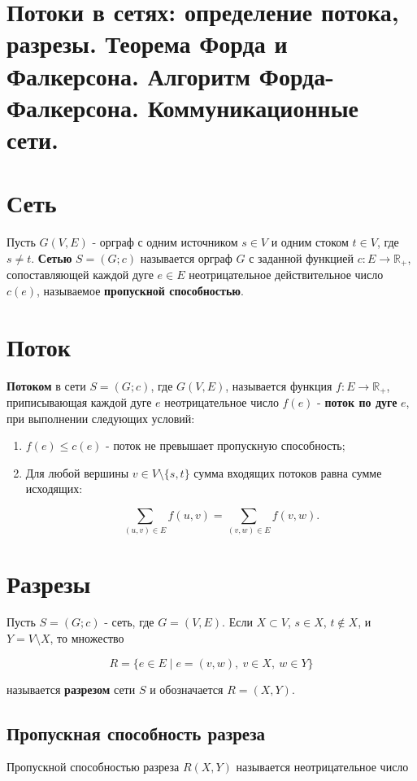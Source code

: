 {
	\section{Потоки в сетях: определение потока, разрезы. Теорема Форда и Фалкерсона.
Алгоритм Форда-Фалкерсона. Коммуникационные сети.}

\section*{Сеть}

Пусть $G(V, E)$ - орграф с одним источником $s \in V$ и одним стоком $t \in V$, где $s \ne t$.  
\textbf{Сетью} $S = (G; c)$ называется орграф $G$ с заданной функцией $c : E \rightarrow \mathbb{R}_+$, сопоставляющей каждой дуге $e \in E$ неотрицательное действительное число $c(e)$, называемое \textbf{пропускной способностью}.

\section*{Поток}

\textbf{Потоком} в сети $S = (G; c)$, где $G(V, E)$, называется функция $f : E \rightarrow \mathbb{R}_+$, приписывающая каждой дуге $e$ неотрицательное число $f(e)$ - \textbf{поток по дуге} $e$, при выполнении следующих условий:
\begin{enumerate}
  \item $f(e) \leq c(e)$ - поток не превышает пропускную способность;
  \item Для любой вершины $v \in V \setminus \{s, t\}$ сумма входящих потоков равна сумме исходящих:
  

\[
  \sum_{(u, v) \in E} f(u, v) = \sum_{(v, w) \in E} f(v, w).
  \]


\end{enumerate}

\section*{Разрезы}

Пусть $S = (G; c)$ - сеть, где $G = (V, E)$.  
Если $X \subset V$, $s \in X$, $t \notin X$, и $Y = V \setminus X$, то множество


\[
R = \{ e \in E \mid e = (v, w),\ v \in X,\ w \in Y \}
\]


называется \textbf{разрезом} сети $S$ и обозначается $R = (X, Y)$.

\subsection*{Пропускная способность разреза}
Пропускной способностью разреза $R(X, Y)$ называется неотрицательное число


}
